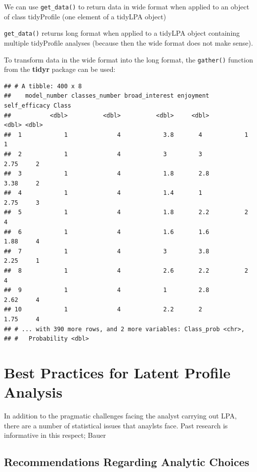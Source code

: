 \documentclass[man]{apa6}
\begin{document}
We can use \texttt{get\_data()} to return data in wide format when applied to an object
of class tidyProfile (one element of a tidyLPA object)

\texttt{get\_data()} returns long format when applied to a
tidyLPA object containing multiple tidyProfile analyses (because then the wide
format does not make sense).

To transform data in the wide format into the long format, the \texttt{gather()}
function from the \textbf{tidyr} package can be used:

\begin{verbatim}
## # A tibble: 400 x 8
##    model_number classes_number broad_interest enjoyment self_efficacy Class
##           <dbl>          <dbl>          <dbl>     <dbl>         <dbl> <dbl>
##  1            1              4            3.8       4            1        1
##  2            1              4            3         3            2.75     2
##  3            1              4            1.8       2.8          3.38     2
##  4            1              4            1.4       1            2.75     3
##  5            1              4            1.8       2.2          2        4
##  6            1              4            1.6       1.6          1.88     4
##  7            1              4            3         3.8          2.25     1
##  8            1              4            2.6       2.2          2        4
##  9            1              4            1         2.8          2.62     4
## 10            1              4            2.2       2            1.75     4
## # ... with 390 more rows, and 2 more variables: Class_prob <chr>,
## #   Probability <dbl>
\end{verbatim}

\hypertarget{best-practices-for-latent-profile-analysis}{%
\section{Best Practices for Latent Profile Analysis}\label{best-practices-for-latent-profile-analysis}}

In addition to the pragmatic challenges facing the analyst carrying out LPA, there
are a number of statistical issues that anaylsts face. Past research is informative in
this respect; Bauer

\hypertarget{recommendations-regarding-analytic-choices}{%
\subsection{Recommendations Regarding Analytic Choices}\label{recommendations-regarding-analytic-choices}}
\end{document}
